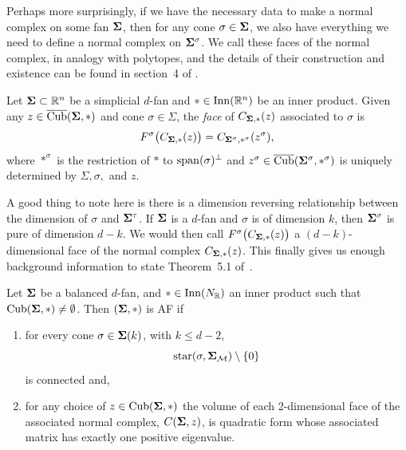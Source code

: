 \documentclass[12pt,oneside]{../../sfsuthesis}
\begin{document}
Perhaps more surprisingly, if we have the necessary data to make a normal complex on some fan \( \bm{\Sigma} \), then for any cone \( \sigma \in \bm{\Sigma} \), we also have everything we need to define a normal complex on \( \bm{\Sigma}^\sigma \).
We call these faces of the normal complex, in analogy with polytopes, and the details of their construction and existence can be found in section~4 of \cite{nowakMixedVolumesNormal2023}.
\begin{definition}\th\label{def:faceNC}
    Let \( \bm{\Sigma} \subset \mathbb{R}^n \) be a simplicial \( d \)-fan and \( \ast \in \operatorname{Inn}(\mathbb{R}^n) \) be an inner product.
    Given any \( z \in \operatorname{\overline{Cub}}(\bm{\Sigma}, \ast) \) and cone \( \sigma \in \Sigma \), the \emph{face} of \( C_{\bm{\Sigma}, \ast}(z) \) associated to \( \sigma \) is
    \[
        F^\sigma\big(C_{\bm{\Sigma}, \ast}(z)\big)  = C_{\bm{\Sigma}^\sigma, \ast^\sigma}(z^\sigma),
    \]
    where \( \ast^\sigma \) is the restriction of \( \ast \) to \( \operatorname{span}(\sigma)^\bot \) and \( z^\sigma \in \operatorname{\overline{Cub}}(\bm{\Sigma}^\sigma, \ast^\sigma) \) is uniquely determined by \( \Sigma, \sigma, \) and \( z \).
\end{definition}
A good thing to note here is there is a dimension reversing relationship between the dimension of \( \sigma \) and \( \bm{\Sigma}^\tau \).
If \( \bm{\Sigma} \) is a \( d \)-fan and \( \sigma \) is of dimension \( k \), then \( \bm{\Sigma}^\sigma \) is pure of dimension \( d-k \).
We would then call \( F^\sigma\big(C_{\bm{\Sigma}, \ast}(z)\big) \) a \( (d-k) \)-dimensional face of the normal complex \( C_{\bm{\Sigma}, \ast}(z) \).
This finally gives us enough background information to state Theorem~5.1 of~\cite{nowakMixedVolumesNormal2023}.
\begin{theorem}\th\label{thm:suffAF}
    Let \( \bm{\Sigma} \) be a balanced \( d \)-fan, and \( \ast \in \mathrm{Inn}(N_{\mathbb{R}}) \) an inner product such that \( \operatorname{Cub}(\bm{\Sigma}, \ast) \neq \emptyset \).
    Then \( (\bm{\Sigma}, \ast) \) is AF if
    \begin{enumerate}[label=\roman*.]
        \item for every cone \( \sigma \in \bm{\Sigma}(k) \), with \( k \leq d - 2 \),
              \[
                  \operatorname{star}(\sigma, \bm{\Sigma}_{\mathcal{M}}) \setminus \{ 0 \}
              \]
              is connected and,
        \item for any choice of \( z \in \operatorname{Cub}(\bm{\Sigma}, \ast) \) the volume of each 2-dimensional face of the associated normal complex, \( C(\bm{\Sigma}, z) \), is quadratic form whose associated matrix has exactly one positive eigenvalue.
    \end{enumerate}
\end{theorem}
\end{document}
